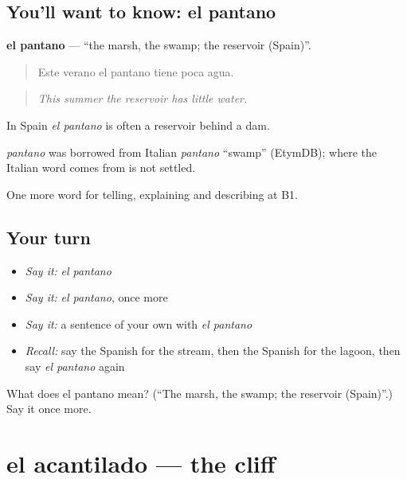 \subsection*{You'll want to know: el pantano}
\textbf{el pantano} — \textquotedblleft{}the marsh, the swamp; the reservoir (Spain)\textquotedblright{}.

\begin{quote}
Este verano el pantano tiene poca agua.
\end{quote}

\begin{quote}
\emph{This summer the reservoir has little water.}
\end{quote}

In Spain \emph{el pantano} is often a reservoir behind a dam.

\begin{cousinweb}
\emph{pantano} was borrowed from Italian \emph{pantano} \textquotedblleft{}swamp\textquotedblright{} (EtymDB); where the Italian word comes from is not settled.
\end{cousinweb}

\begin{grammarlens}[title={What you've built}]
One more word for telling, explaining and describing at B1.
\end{grammarlens}

\subsection*{Your turn}
\begin{itemize}
\raggedright
  \item \emph{Say it:} \emph{el pantano}
  \item \emph{Say it:} \emph{el pantano}, once more
  \item \emph{Say it:} a sentence of your own with \emph{el pantano}
  \item \emph{Recall:} say the Spanish for the stream, then the Spanish for the lagoon, then say \emph{el pantano} again
\end{itemize}

\begin{tcolorbox}[breakable,colback=teal!4,colframe=teal!35!black,title={Before you move on}]
What does el pantano mean? (\textquotedblleft{}The marsh, the swamp; the reservoir (Spain)\textquotedblright{}.) Say it once more.
\end{tcolorbox}
\section[el acantilado]{el acantilado — the cliff}

